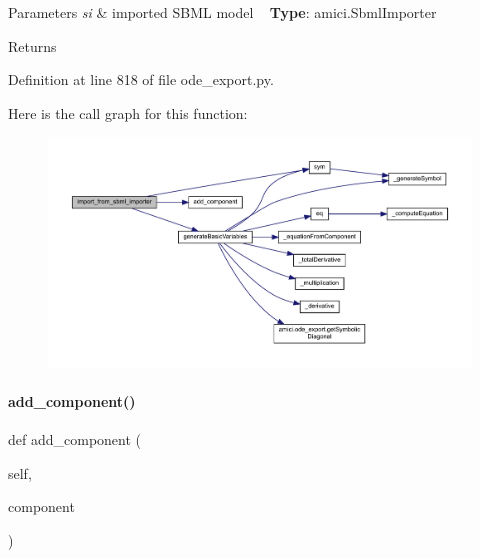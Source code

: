 \begin{DoxyParams}{Parameters}
{\em si} & imported S\+B\+ML model ~\newline
{\bfseries Type}\+: amici.\+Sbml\+Importer\\
\hline
\end{DoxyParams}
\begin{DoxyReturn}{Returns}

\end{DoxyReturn}


Definition at line 818 of file ode\+\_\+export.\+py.

Here is the call graph for this function\+:
\nopagebreak
\begin{figure}[H]
\begin{center}
\leavevmode
\includegraphics[width=350pt]{classamici_1_1ode__export_1_1_o_d_e_model_a3a3ebfdaf0d1f08adf028afb10d5b5c1_cgraph}
\end{center}
\end{figure}
\mbox{\label{classamici_1_1ode__export_1_1_o_d_e_model_a2731bd07d8e64b54d6b455d6d8441f13}} 
\paragraph{\texorpdfstring{add\+\_\+component()}{add\_component()}}
{\footnotesize\ttfamily def add\+\_\+component (\begin{DoxyParamCaption}\item[{}]{self,  }\item[{}]{component }\end{DoxyParamCaption})}


